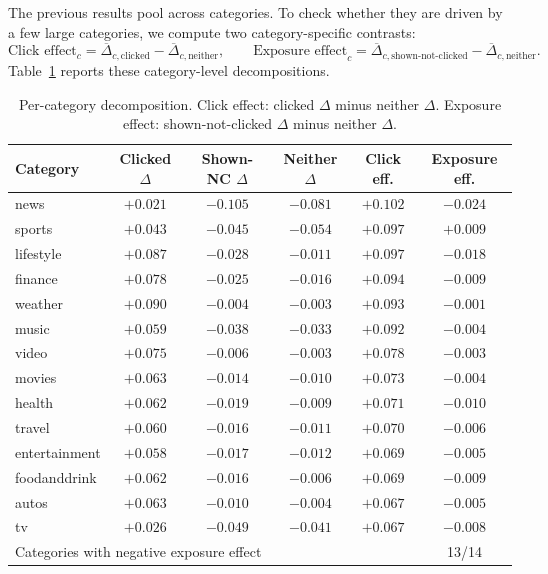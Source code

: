 \documentclass[11pt]{article}
\begin{document}
The previous results pool across categories. To check whether they are driven by a few large categories, we compute two category-specific contrasts:
\[
\text{Click effect}_c = \overline{\Delta}_{c,\text{clicked}} - \overline{\Delta}_{c,\text{neither}},
\qquad
\text{Exposure effect}_c = \overline{\Delta}_{c,\text{shown-not-clicked}} - \overline{\Delta}_{c,\text{neither}}.
\]
Table~\ref{tab:exposure_percat} reports these category-level decompositions.
\begin{table}[ht]
\centering
\caption{Per-category decomposition. Click effect: clicked $\Delta$ minus neither $\Delta$. Exposure effect: shown-not-clicked $\Delta$ minus neither $\Delta$.}
\label{tab:exposure_percat}
\small
\begin{tabular}{lccccc}
\toprule
Category & Clicked $\Delta$ & Shown-NC $\Delta$ & Neither $\Delta$ & Click eff. & Exposure eff. \\
\midrule
news & $+0.021$ & $-0.105$ & $-0.081$ & $+0.102$ & $-0.024$ \\
sports & $+0.043$ & $-0.045$ & $-0.054$ & $+0.097$ & $+0.009$ \\
lifestyle & $+0.087$ & $-0.028$ & $-0.011$ & $+0.097$ & $-0.018$ \\
finance & $+0.078$ & $-0.025$ & $-0.016$ & $+0.094$ & $-0.009$ \\
weather & $+0.090$ & $-0.004$ & $-0.003$ & $+0.093$ & $-0.001$ \\
music & $+0.059$ & $-0.038$ & $-0.033$ & $+0.092$ & $-0.004$ \\
video & $+0.075$ & $-0.006$ & $-0.003$ & $+0.078$ & $-0.003$ \\
movies & $+0.063$ & $-0.014$ & $-0.010$ & $+0.073$ & $-0.004$ \\
health & $+0.062$ & $-0.019$ & $-0.009$ & $+0.071$ & $-0.010$ \\
travel & $+0.060$ & $-0.016$ & $-0.011$ & $+0.070$ & $-0.006$ \\
entertainment & $+0.058$ & $-0.017$ & $-0.012$ & $+0.069$ & $-0.005$ \\
foodanddrink & $+0.062$ & $-0.016$ & $-0.006$ & $+0.069$ & $-0.009$ \\
autos & $+0.063$ & $-0.010$ & $-0.004$ & $+0.067$ & $-0.005$ \\
tv & $+0.026$ & $-0.049$ & $-0.041$ & $+0.067$ & $-0.008$ \\
\midrule
\multicolumn{5}{l}{Categories with negative exposure effect} & 13/14 \\
\bottomrule
\end{tabular}
\end{table}
\FloatBarrier
\end{document}
